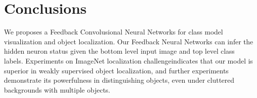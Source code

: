 \section{Conclusions}

We proposes a Feedback Convolusional Neural Networks for class model visualization and object localization. 
Our Feedback Neural Networks can infer the hidden neuron status given the bottom level input image and top level class labels.
Experiments on ImageNet localization challengeindicates that our model is superior in weakly supervised object localization, and further experiments demonstrate its powerfulness in distinguishing objects, even under cluttered backgrounds with multiple objects. 
